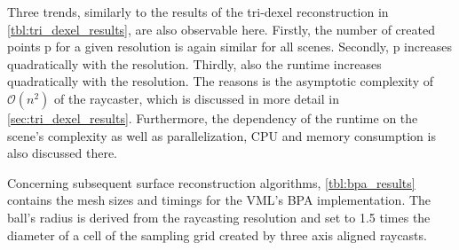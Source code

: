 %
Three trends, similarly to the results of the tri-dexel reconstruction in \cref{tbl:tri_dexel_results}, are also observable here.
Firstly, the number of created points p for a given resolution is again similar for all scenes.
Secondly, p increases quadratically with the resolution.
Thirdly, also the runtime increases quadratically with the resolution.
The reasons is the asymptotic complexity of $\mathcal{O}(n^2)$ of the raycaster, which is discussed in more detail in \cref{sec:tri_dexel_results}.
Furthermore, the dependency of the runtime on the scene's complexity as well as parallelization, CPU and memory consumption is also discussed there.

Concerning subsequent surface reconstruction algorithms, \cref{tbl:bpa_results} contains the mesh sizes and timings for the VML's BPA implementation.
The ball's radius is derived from the raycasting resolution and set to 1.5 times the diameter of a cell of the sampling grid created by three axis aligned raycasts.
%
